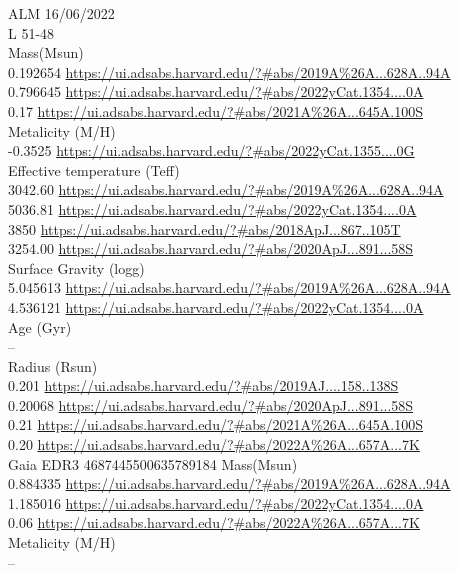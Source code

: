 ALM 16/06/2022\\
L 51-48\\
Mass(Msun)\\
0.192654 \url{https://ui.adsabs.harvard.edu/?#abs/2019A%26A...628A..94A}\\
0.796645 \url{https://ui.adsabs.harvard.edu/?#abs/2022yCat.1354....0A}\\
0.17 \url{https://ui.adsabs.harvard.edu/?#abs/2021A%26A...645A.100S}\\
Metalicity (M/H)\\
-0.3525 \url{https://ui.adsabs.harvard.edu/?#abs/2022yCat.1355....0G}\\
Effective temperature (Teff) \\
3042.60 \url{https://ui.adsabs.harvard.edu/?#abs/2019A%26A...628A..94A}\\
5036.81 \url{https://ui.adsabs.harvard.edu/?#abs/2022yCat.1354....0A}\\
3850 \url{https://ui.adsabs.harvard.edu/?#abs/2018ApJ...867..105T}\\
3254.00 \url{https://ui.adsabs.harvard.edu/?#abs/2020ApJ...891...58S}\\
Surface Gravity (logg) \\
5.045613 \url{https://ui.adsabs.harvard.edu/?#abs/2019A%26A...628A..94A}\\
4.536121 \url{https://ui.adsabs.harvard.edu/?#abs/2022yCat.1354....0A}\\
Age (Gyr)\\
--\\
Radius (Rsun)\\
0.201 \url{https://ui.adsabs.harvard.edu/?#abs/2019AJ....158..138S}\\
0.20068 \url{https://ui.adsabs.harvard.edu/?#abs/2020ApJ...891...58S}\\
0.21 \url{https://ui.adsabs.harvard.edu/?#abs/2021A%26A...645A.100S}\\
0.20 \url{https://ui.adsabs.harvard.edu/?#abs/2022A%26A...657A...7K}\\
Gaia EDR3 4687445500635789184 
Mass(Msun)\\
0.884335 \url{https://ui.adsabs.harvard.edu/?#abs/2019A%26A...628A..94A}\\
1.185016 \url{https://ui.adsabs.harvard.edu/?#abs/2022yCat.1354....0A}\\
0.06 \url{https://ui.adsabs.harvard.edu/?#abs/2022A%26A...657A...7K}\\
Metalicity (M/H)\\
--\\
